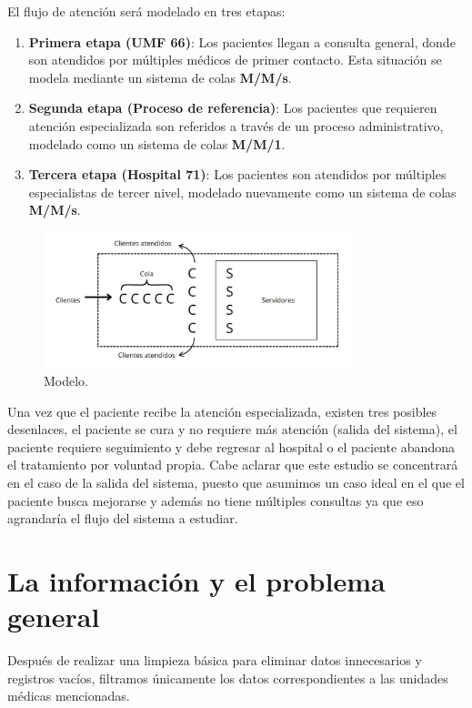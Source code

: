\documentclass[10pt]{article}
\begin{document}
    El flujo de atención será modelado en tres etapas:

    \begin{enumerate}
        \item \textbf{Primera etapa (UMF 66)}: Los pacientes llegan a consulta general, donde son atendidos por múltiples médicos de primer contacto. Esta situación se modela mediante un sistema de colas \textbf{M/M/s}.
        
        \item \textbf{Segunda etapa (Proceso de referencia)}: Los pacientes que requieren atención especializada son referidos a través de un proceso administrativo, modelado como un sistema de colas \textbf{M/M/1}.
        
        \item \textbf{Tercera etapa (Hospital 71)}: Los pacientes son atendidos por múltiples especialistas de tercer nivel, modelado nuevamente como un sistema de colas \textbf{M/M/s}.
    \end{enumerate}

    \begin{figure}[h]
		\centering
		\includegraphics[width=90mm]{./images/cap1.jpg}
		\caption{Modelo.}
	\end{figure}
	\FloatBarrier

    Una vez que el paciente recibe la atención especializada, existen tres posibles desenlaces, el paciente se cura y no requiere más atención (salida del sistema), el paciente requiere seguimiento y debe regresar al hospital o el paciente abandona el tratamiento por voluntad propia. Cabe aclarar que este estudio se concentrará en el caso de la salida del sistema, puesto que asumimos un caso ideal en el que el paciente busca mejorarse y además no tiene múltiples consultas ya que eso agrandaría el flujo del sistema a estudiar.

    \section{La información y el problema general}
    Después de realizar una limpieza básica para eliminar datos innecesarios y registros vacíos, filtramos únicamente los datos correspondientes a las unidades médicas mencionadas.
\end{document}
